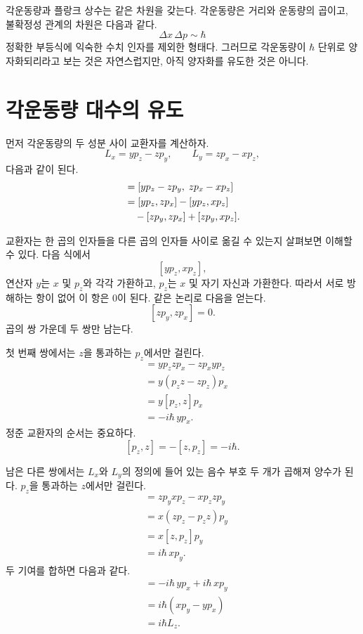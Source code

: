각운동량과 플랑크 상수는 같은 차원을 갖는다. 각운동량은 거리와 운동량의 곱이고, 불확정성 관계의 차원은 다음과 같다.\begin{equation}
\Delta x\,\Delta p\sim\hbar
\end{equation}정확한 부등식에 익숙한 수치 인자를 제외한 형태다. 그러므로 각운동량이 \(\hbar\) 단위로 양자화되리라고 보는 것은 자연스럽지만, 아직 양자화를 유도한 것은 아니다.

\section{각운동량 대수의 유도}

먼저 각운동량의 두 성분 사이 교환자를 계산하자.\[
L_x=yp_z-zp_y,\qquad
L_y=zp_x-xp_z,
\]다음과 같이 된다.\begin{align}
[L_x,L_y]
&=[yp_z-zp_y,\;zp_x-xp_z] \\
&=[yp_z,zp_x]-[yp_z,xp_z] \notag\\
&\quad{}-[zp_y,zp_x]+[zp_y,xp_z].
\end{align}

\begin{classroomqa}\end{classroomqa}

교환자는 한 곱의 인자들을 다른 곱의 인자들 사이로 옮길 수 있는지 살펴보면 이해할 수 있다. 다음 식에서
\[
[yp_z,xp_z],
\]
연산자 \(y\)는 \(x\) 및 \(p_z\)와 각각 가환하고, \(p_z\)는 \(x\) 및 자기 자신과 가환한다. 따라서 서로 방해하는 항이 없어 이 항은 0이 된다. 같은 논리로 다음을 얻는다.
\[
[zp_y,zp_x]=0.
\]
곱의 쌍 가운데 두 쌍만 남는다.

첫 번째 쌍에서는 \(z\)을 통과하는 \(p_z\)에서만 걸린다.\begin{align}
[yp_z,zp_x]
&=yp_zzp_x-zp_xyp_z \\
&=y(p_zz-zp_z)p_x \\
&=y[p_z,z]p_x \\
&=-i\hbar\,yp_x.
\end{align}정준 교환자의 순서는 중요하다.\[
[p_z,z]=-[z,p_z]=-i\hbar.
\]

남은 다른 쌍에서는 \(L_x\)와 \(L_y\)의 정의에 들어 있는 음수 부호 두 개가 곱해져 양수가 된다. \(p_z\)을 통과하는 \(z\)에서만 걸린다.\begin{align}
[zp_y,xp_z]
&=zp_yxp_z-xp_zzp_y \\
&=x(zp_z-p_zz)p_y \\
&=x[z,p_z]p_y \\
&=i\hbar\,xp_y.
\end{align}두 기여를 합하면 다음과 같다.\begin{align}
[L_x,L_y]
&=-i\hbar\,yp_x+i\hbar\,xp_y \\
&=i\hbar(xp_y-yp_x) \\
&=i\hbar L_z.
\end{align}

